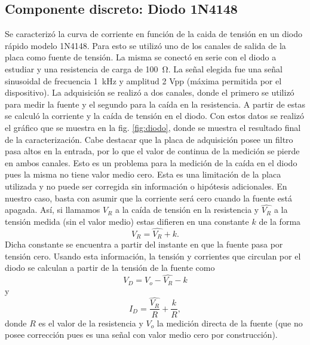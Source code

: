 \documentclass[a4paper,11pt]{article}
\begin{document}
	\subsection{Componente discreto: Diodo 1N4148}
	\label{sec:discreto}
	Se caracterizó la curva de corriente en función de la caida de tensión en un diodo rápido modelo 1N4148. Para esto se utilizó uno de los canales de salida de la placa como fuente de tensión. La misma se conectó en serie con el diodo a estudiar y una resistencia de carga de \SI{100}{\ohm}. La señal elegida fue una señal sinusoidal de frecuencia \SI{1}{\kilo\hertz} y amplitud 2 Vpp (máxima permitida por el dispositivo). La adquisición se realizó a dos canales, donde el primero se utilizó para medir la fuente y el segundo para la caída en la resistencia. A partir de estas se calculó la corriente y la caída de tensión en el diodo. Con estos datos se realizó el gráfico que se muestra en la fig. \ref{fig:diodo}, donde se muestra el resultado final de la caracterización. Cabe destacar que la placa de adquisición posee un filtro pasa altos en la entrada, por lo que el valor de continua de la medición se pierde en ambos canales. Esto es un problema para la medición de la caída en el diodo pues la misma no tiene valor medio cero. Esta es una limitación de la placa utilizada y no puede ser corregida sin información o hipótesis adicionales. En nuestro caso, basta con asumir que la corriente será cero cuando la fuente está apagada. Así, si llamamos $V_R$ a la caída de tensión en la resistencia y $\hat{V_R}$ a la tensión medida (sin el valor medio) estas difieren en una constante $k$ de la forma
	\begin{equation}
	V_R = \hat{V_R} + k.
	\end{equation}
Dicha constante se encuentra a partir del instante en que la fuente pasa por tensión cero. Usando esta información, la tensión y corrientes que circulan por el diodo se calculan a partir de la tensión de la fuente como
	\begin{equation}
	V_D = V_o - \hat{V_R} - k
	\end{equation}
	y
	\begin{equation}
	I_D = \frac{\hat{V_R}}{R} + \frac{k}{R},
	\end{equation}
	donde $R$ es el valor de la resistencia y $V_o$ la medición directa de la fuente (que no posee corrección pues es una señal con valor medio cero por construcción).
\end{document}
